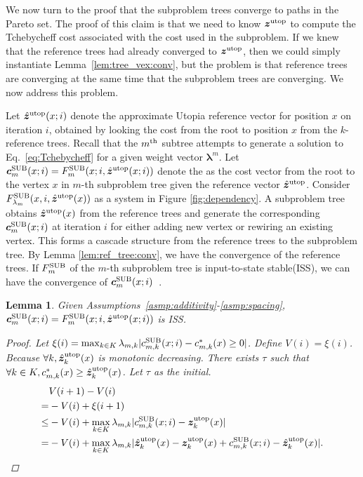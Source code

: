 \documentclass{article}
\newtheorem{lem}{Lemma}
\begin{document}
We now turn to the proof that the subproblem trees converge to paths in the Pareto set.
The proof of this claim is that we need to know $\bm{z}^{\rm utop} $ to compute the Tchebycheff cost associated with the cost used in the subproblem. 
If we knew that the reference trees had already converged to $\bm{z}^{\rm utop} $, then we could simply instantiate Lemma~\ref{lem:tree_vex:conv}, but the problem is that reference trees are converging at the same time that the subproblem trees are converging.
We now address this problem.  

Let $  \hat{\bm{z}}^{\rm utop}(x;i) $ denote the approximate Utopia reference vector for position $x$ on iteration $i$, obtained by looking the cost from the root to position $x$ from the $k$-reference trees.
Recall that the $m^{\rm th}$ subtree attempts to generate a solution to Eq.~\eqref{eq:Tchebycheff} for a given weight vector ${\mathbf \lambda}^m$.
Let $ \bm{c}^{\rm SUB}_{m} ( x ;i ) = F^{\rm SUB}_{m} ( x; i, \hat{\bm{z}}^{\rm utop} (x;i) ) $ denote the as the cost vector from the root to the vertex $ x $ in $ m $-th subproblem tree given the reference vector $  \hat{\bm{z}}^{\rm utop} $.
Consider $ F^{\rm SUB}_{\lambda_{m}} ( x, i, \hat{\bm{z}}^{\rm utop} (x) ) $ as a system in Figure \ref{fig:dependency}.
A subproblem tree obtains $ \hat{\bm{z}}^{\rm utop} (x) $ from the reference trees and generate the corresponding $ \bm{c}^{\rm SUB}_{m} ( x ;i ) $ at iteration $ i $ for either adding new vertex or rewiring an existing vertex.
This forms a cascade structure from the reference trees to the subproblem tree. 
By Lemma \ref{lem:ref_tree:conv}, we have the convergence of the reference trees.
If $  F^{\rm SUB}_{m} $ of the $ m $-th subproblem tree is input-to-state stable(ISS), we can have the convergence of $ \bm{c}^{\rm SUB}_{m} ( x ;i ) $~\cite{khalil1996nonlinear}.

\begin{lem}
\label{lem:sub_tree:iss}
Given Assumptions~\ref{asmp:additivity}-\ref{asmp:spacing}, $ \bm{c}^{\rm SUB}_{m} ( x ;i ) = F^{\rm SUB}_{m} ( x; i, \hat{\bm{z}}^{\rm utop} (x;i) ) $ is ISS.
\begin{proof}
Let $ \xi (i) = \max_{k \in K} \lambda_{m , k} | c^{\rm SUB}_{m, k} (x; i) - c_{m, k}^{*} (x) \geq 0 | $.
Define $ V(i) = \xi (i) $.
Because $ \forall k, \hat{\bm{z}}^{\rm utop}_{k} (x) $ is monotonic decreasing.
There exists $ \tau $ such that $ \forall k \in K , c_{m, k}^{*}(x) \geq \hat{\bm{z}}^{\rm utop}_{k} (x) $.
Let $ \tau $ as the initial.
\begin{equation}
\begin{aligned}
& V(i+1) - V(i) \\
= & -V(i) + \xi (i+1) \\
\leq& - V(i) + \max_{k \in K} \lambda_{m , k} | c^{\rm SUB}_{m, k} (x; i) - \bm{z}^{\rm utop}_{k} (x) | \\
= & - V(i) + \max_{k \in K} \lambda_{m , k} | \hat{\bm{z}}^{\rm utop}_{k} (x)  - \bm{z}^{\rm utop}_{k} (x) + c^{\rm SUB}_{m, k} (x; i) - \hat{\bm{z}}^{\rm utop}_{k} (x) | .
\end{aligned}
\end{equation}
\end{proof}
\end{lem}
\end{document}
